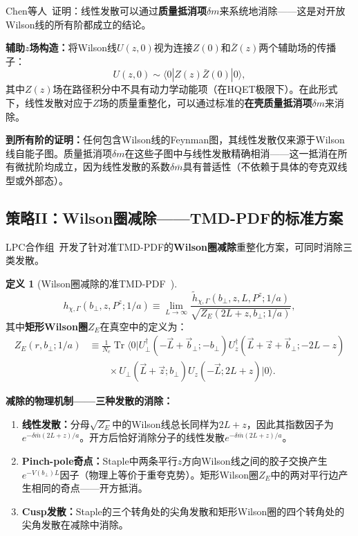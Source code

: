 \documentclass[12pt,a4paper]{ctexart}
\theoremstyle{definition}
\newtheorem{definition}{定义}[section]
\begin{document}
Chen等人~\cite{Chen2018WLrenorm}证明：线性发散可以通过\textbf{质量抵消项}$\delta m$来系统地消除——这是对开放Wilson线的所有阶都成立的结论。

\textbf{辅助$z$场构造：}将Wilson线$U(z,0)$视为连接$Z(0)$和$\bar Z(z)$两个辅助场的传播子：
\begin{equation}
U(z,0) \sim \langle 0| Z(z) \bar Z(0) |0 \rangle,
\end{equation}
其中$Z(z)$场在路径积分中不具有动力学动能项（在HQET极限下）。在此形式下，线性发散对应于$Z$场的质量重整化，可以通过标准的\textbf{在壳质量抵消项}$\delta m$来消除。

\textbf{到所有阶的证明：}任何包含Wilson线的Feynman图，其线性发散仅来源于Wilson线自能子图。质量抵消项$\delta m$在这些子图中与线性发散精确相消——这一抵消在所有微扰阶均成立，因为线性发散的系数$\delta\bar{m}$具有普适性（不依赖于具体的夸克双线型或外部态）。

\subsection{策略II：Wilson圈减除——TMD-PDF的标准方案}

LPC合作组~\cite{Zhang2022renormTMD}开发了针对准TMD-PDF的\textbf{Wilson圈减除}重整化方案，可同时消除三类发散。

\begin{definition}[Wilson圈减除的准TMD-PDF~\cite{Zhang2022renormTMD}]
\begin{equation}
\boxed{h_{\chi,\Gamma}(b_\perp, z, P^z; 1/a) \equiv \lim_{L\to\infty} \frac{\tilde{h}_{\chi,\Gamma}(b_\perp, z, L, P^z; 1/a)}{\sqrt{Z_E(2L+z, b_\perp; 1/a)}}},
\label{eq:WL_subtraction}
\end{equation}
其中\textbf{矩形Wilson圈}$Z_E$在真空中的定义为：
\begin{equation}
\begin{aligned}
Z_E(r, b_\perp; 1/a) &\equiv \frac{1}{N_c} \operatorname{Tr} \langle 0| U_\perp^\dagger(-\vec{L}+\vec{b}_\perp; -b_\perp) U_z^\dagger(\vec{L}+\vec{z}+\vec{b}_\perp; -2L-z) \\
&\qquad \times U_\perp(\vec{L}+\vec{z}; b_\perp) U_z(-\vec{L}; 2L+z) |0\rangle.
\label{eq:ZE_wilson_loop}
\end{aligned}
\end{equation}
\end{definition}

\textbf{减除的物理机制——三种发散的消除：}
\begin{enumerate}[leftmargin=*]
    \item \textbf{线性发散：}分母$\sqrt{Z_E}$中的Wilson线总长同样为$2L+z$，因此其指数因子为$e^{-\delta\bar{m}(2L+z)/a}$。开方后恰好消除分子的线性发散$e^{-\delta\bar{m}(2L+z)/a}$。
    \item \textbf{Pinch-pole奇点：}Staple中两条平行$z$方向Wilson线之间的胶子交换产生$e^{-V(b_\perp)L}$因子（物理上等价于重夸克势）。矩形Wilson圈$Z_E$中的两对平行边产生相同的奇点——开方抵消。
    \item \textbf{Cusp发散：}Staple的三个转角处的尖角发散和矩形Wilson圈的四个转角处的尖角发散在减除中消除。
\end{enumerate}
\end{document}
